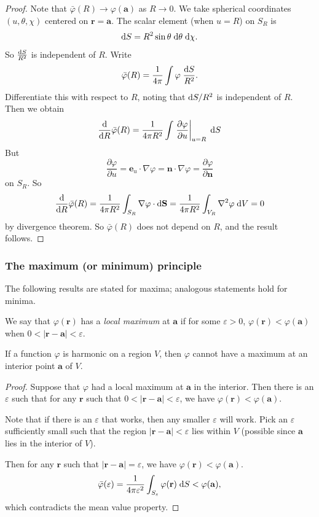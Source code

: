 \documentclass[a4paper]{article}
\begin{document}
\begin{proof}
  Note that $\bar\varphi (R) \to \varphi(\mathbf{a})$ as $R \to 0$. We take spherical coordinates $(u, \theta, \chi)$ centered on $\mathbf{r} = \mathbf{a}$. The scalar element (when $u = R$) on $S_R$ is
  \[
    \mathrm{d} S = R^2 \sin \theta\;\mathrm{d} \theta\;\mathrm{d} \chi.
  \]
  So $\frac{\mathrm{d} S}{R^2}$ is independent of $R$. Write
  \[
    \bar\varphi(R) = \frac{1}{4\pi}\int \varphi \;\frac{\mathrm{d} S}{R^2}.
  \]
  Differentiate this with respect to $R$, noting that $\mathrm{d} S/R^2$ is independent of $R$. Then we obtain
  \[
    \frac{\mathrm{d}}{\mathrm{d} R}\bar\varphi(R) = \frac{1}{4\pi R^2}\int \left.\frac{\partial \varphi}{\partial u}\right|_{u = R}\;\mathrm{d} S
  \]
  But
  \[
    \frac{\partial\varphi}{\partial u} = \mathbf{e}_u \cdot \nabla \varphi = \mathbf{n}\cdot \nabla \varphi = \frac{\partial\varphi}{\partial \mathbf{n}}
  \]
  on $S_R$. So
  \[
    \frac{\mathrm{d}}{\mathrm{d} R}\bar\varphi(R) = \frac{1}{4\pi R^2}\int_{S_R} \nabla \varphi \cdot \mathrm{d} \mathbf{S} = \frac{1}{4\pi R^2}\int_{V_R}\nabla^2 \varphi \;\mathrm{d} V = 0
  \]
  by divergence theorem. So $\bar \varphi(R)$ does not depend on $R$, and the result follows.
\end{proof}
\subsubsection{The maximum (or minimum) principle}
The following results are stated for maxima; analogous statements hold for minima.

\begin{defi}
  We say that $\varphi(\mathbf{r})$ has a \emph{local maximum} at $\mathbf{a}$ if for some $\varepsilon > 0$, $\varphi(\mathbf{r}) < \varphi(\mathbf{a})$ when $0 < |\mathbf{r} - \mathbf{a}| < \varepsilon$.
\end{defi}

\begin{prop}
  If a function $\varphi$ is harmonic on a region $V$, then $\varphi$ cannot have a maximum at an interior point $\mathbf{a}$ of $V$.
\end{prop}

\begin{proof}
  Suppose that $\varphi$ had a local maximum at $\mathbf{a}$ in the interior. Then there is an $\varepsilon$ such that for any $\mathbf{r}$ such that $0 < |\mathbf{r} - \mathbf{a}| < \varepsilon$, we have $\varphi(\mathbf{r}) < \varphi (\mathbf{a})$.

  Note that if there is an $\varepsilon$ that works, then any smaller $\varepsilon$ will work. Pick an $\varepsilon$ sufficiently small such that the region $|\mathbf{r} - \mathbf{a}| < \varepsilon$ lies within $V$ (possible since $\mathbf{a}$ lies in the interior of $V$).

  Then for any $\mathbf{r}$ such that $|\mathbf{r} - \mathbf{a}| = \varepsilon$, we have $\varphi(\mathbf{r}) < \varphi(\mathbf{a})$.
  \[
    \bar\varphi (\varepsilon) = \frac{1}{4\pi \varepsilon^2}\int_{S_\varepsilon}\varphi(\mathbf{r})\;\mathrm{d} S < \varphi(\mathbf{a}),
  \]
  which contradicts the mean value property.
\end{proof}
\end{document}
